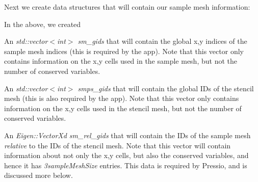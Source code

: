 Next we create data structures that will contain our sample mesh information\+: 
\begin{DoxyCode}{0}
\end{DoxyCode}


In the above, we created
\begin{DoxyEnumerate}
\item An {\itshape std\+::vector$<$int$>$ sm\+\_\+gids} that will contain the global x,y indices of the sample mesh indices (this is required by the app). Note that this vector only contains information on the x,y cells used in the sample mesh, but not the number of conserved variables.
\item An {\itshape std\+::vector$<$int$>$ smps\+\_\+gids} that will contain the global I\+Ds of the stencil mesh (this is also required by the app). Note that this vector only contains information on the x,y cells used in the stencil mesh, but not the number of conserved variables. ~\newline

\item An {\itshape Eigen\+::\+Vector\+Xd sm\+\_\+rel\+\_\+gids} that will contain the I\+Ds of the sample mesh {\itshape relative} to the I\+Ds of the stencil mesh. Note that this vector will contain information about not only the x,y cells, but also the conserved variables, and hence it has {\itshape 3sample\+Mesh\+Size} entries. This data is required by Pressio, and is discussed more below.
\end{DoxyEnumerate}

